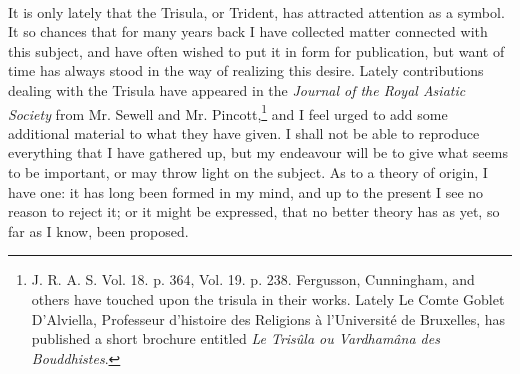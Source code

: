 \documentclass[a4paper, 11pt, oneside, english]{article}
\begin{document}
\paragraph{}
It is only lately that the Trisula, or Trident, has attracted attention as a symbol. It so chances that for many years back I have collected matter connected with this subject, and have often wished to put it in form for publication, but want of time has always stood in the way of realizing this desire. Lately contributions dealing with the Trisula have appeared in the \emph{Journal of the Royal Asiatic Society} from Mr. Sewell and Mr. Pincott,\footnote{J. R. A. S. Vol. 18. p. 364, Vol. 19. p. 238. Fergusson, Cunningham, and others have touched upon the trisula in their works. Lately Le Comte Goblet D'Alviella, Professeur d'histoire des Religions à l'Université de Bruxelles, has published a short brochure entitled \emph{Le Trisûla ou Vardhamâna des Bouddhistes}.} and I feel urged to add some additional material to what they have given. I shall not be able to reproduce everything that I have gathered up, but my endeavour will be to give what seems to be important, or may throw light on the subject. As to a theory of origin, I have one: it has long been formed in my mind, and up to the present I see no reason to reject it; or it might be expressed, that no better theory has as yet, so far as I know, been proposed.
\end{document}
